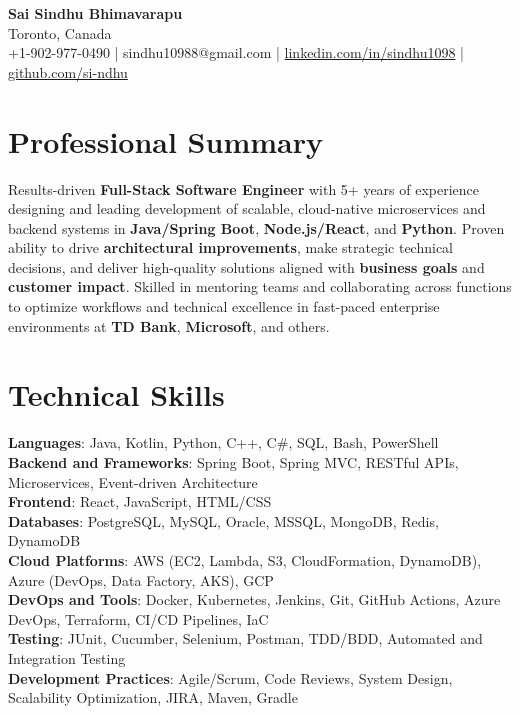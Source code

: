 \documentclass[letterpaper,11pt]{article}
\begin{document}
\begin{center}
  {\Large \textbf{Sai Sindhu Bhimavarapu}} \\
  Toronto, Canada \\
  +1-902-977-0490 \enspace | \enspace sindhu10988@gmail.com \enspace | \enspace \href{https://www.linkedin.com/in/sindhu1098/}{linkedin.com/in/sindhu1098} \enspace | \enspace \href{https://github.com/si-ndhu}{github.com/si-ndhu}
\end{center}

\section{Professional Summary}
  \begin{itemize}[leftmargin=0.15in, label={}]
    \small{\item{
     Results-driven \textbf{Full-Stack Software Engineer} with 5+ years of experience designing and leading development of scalable, cloud-native microservices and backend systems in \textbf{Java/Spring Boot}, \textbf{Node.js/React}, and \textbf{Python}. Proven ability to drive \textbf{architectural improvements}, make strategic technical decisions, and deliver high-quality solutions aligned with \textbf{business goals} and \textbf{customer impact}. Skilled in mentoring teams and collaborating across functions to optimize workflows and technical excellence in fast-paced enterprise environments at \textbf{TD Bank}, \textbf{Microsoft}, and others.
    }}
  \end{itemize}
\vspace{-16pt}

\section{Technical Skills}
 \begin{itemize}[leftmargin=0.15in, label={}]
    \small{\item{
     \textbf{Languages}: Java, Kotlin, Python, C++, C\#, SQL, Bash, PowerShell \\
     \textbf{Backend and Frameworks}: Spring Boot, Spring MVC, RESTful APIs, Microservices, Event-driven Architecture \\
     \textbf{Frontend}: React, JavaScript, HTML/CSS \\
     \textbf{Databases}: PostgreSQL, MySQL, Oracle, MSSQL, MongoDB, Redis, DynamoDB \\
     \textbf{Cloud Platforms}: AWS (EC2, Lambda, S3, CloudFormation, DynamoDB), Azure (DevOps, Data Factory, AKS), GCP \\
     \textbf{DevOps and Tools}: Docker, Kubernetes, Jenkins, Git, GitHub Actions, Azure DevOps, Terraform, CI/CD Pipelines, IaC \\
     \textbf{Testing}: JUnit, Cucumber, Selenium, Postman, TDD/BDD, Automated and Integration Testing \\
     \textbf{Development Practices}: Agile/Scrum, Code Reviews, System Design, Scalability Optimization, JIRA, Maven, Gradle
    }}
 \end{itemize}
\vspace{-16pt}
\end{document}
